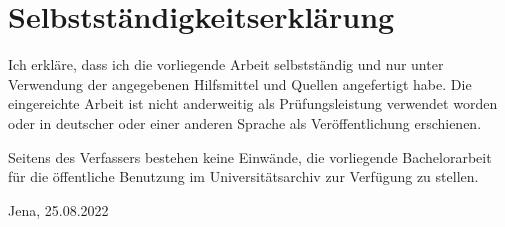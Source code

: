 \documentclass[12pt, a4paper]{report}
\begin{document}
\cleardoublepage
\chapter*{Selbstständigkeitserklärung}
Ich erkläre, dass ich die vorliegende Arbeit selbstständig und nur unter Verwendung der angegebenen Hilfsmittel und Quellen angefertigt habe.
Die eingereichte Arbeit ist nicht anderweitig als Prüfungsleistung verwendet worden oder in deutscher oder einer anderen Sprache als Veröffentlichung erschienen.

\setlength{\parindent}{0pt}
\vspace{10pt}
Seitens des Verfassers bestehen keine Einwände, die vorliegende Bachelorarbeit für die öffentliche Benutzung im Universitätsarchiv zur Verfügung zu stellen. \vspace{80pt}

Jena, 25.08.2022
\cleardoublepage
\end{document}
